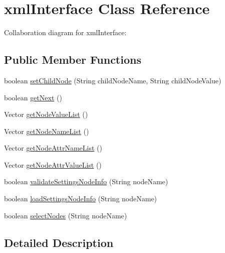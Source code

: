 \hypertarget{class_microchip_m_p_f_s_1_1xml_interface}{}\section{xml\+Interface Class Reference}
\label{class_microchip_m_p_f_s_1_1xml_interface}


Collaboration diagram for xml\+Interface\+:
\subsection*{Public Member Functions}
\begin{DoxyCompactItemize}
\item 
boolean \hyperlink{class_microchip_m_p_f_s_1_1xml_interface_a67ded8d8b9ea75b8e2fad9ccd3a39128}{set\+Child\+Node} (String child\+Node\+Name, String child\+Node\+Value)
\item 
boolean \hyperlink{class_microchip_m_p_f_s_1_1xml_interface_af4d3290d219be38c0880eb406b9b1d86}{get\+Next} ()
\item 
Vector \hyperlink{class_microchip_m_p_f_s_1_1xml_interface_abd90c4b2ebc49b4a697fb962f142a89d}{get\+Node\+Value\+List} ()
\item 
Vector \hyperlink{class_microchip_m_p_f_s_1_1xml_interface_aeed9efa9376bf111f3b16e5fb4f74a22}{get\+Node\+Name\+List} ()
\item 
Vector \hyperlink{class_microchip_m_p_f_s_1_1xml_interface_a83a068675ad8373054a076f5458450c1}{get\+Node\+Attr\+Name\+List} ()
\item 
Vector \hyperlink{class_microchip_m_p_f_s_1_1xml_interface_a208d5ca7198e36197c06eef8cde82e92}{get\+Node\+Attr\+Value\+List} ()
\item 
boolean \hyperlink{class_microchip_m_p_f_s_1_1xml_interface_a94855324cee6a000bb4b527f4ec21ef4}{validate\+Settings\+Node\+Info} (String node\+Name)
\item 
boolean \hyperlink{class_microchip_m_p_f_s_1_1xml_interface_a8d99bb7eb1df1c831271fd7bc0088e9e}{load\+Settings\+Node\+Info} (String node\+Name)
\item 
boolean \hyperlink{class_microchip_m_p_f_s_1_1xml_interface_aec24d6faf0e847d463233ff73d085a5b}{select\+Nodes} (String node\+Name)
\end{DoxyCompactItemize}


\subsection{Detailed Description}


